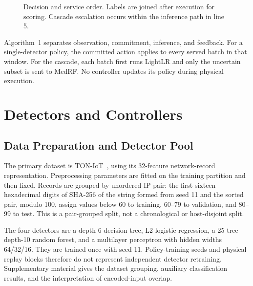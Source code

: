 \documentclass[journal]{IEEEtran}
\begin{document}
\begin{figure}[t]
\centering{}
\caption{Decision and service order. Labels are joined after execution for scoring. Cascade escalation occurs within the inference path in line 5.}
\label{fig:algorithm}
\end{figure}

Algorithm~1 separates observation, commitment, inference, and feedback. For a single-detector policy, the committed action applies to every served batch in that window. For the cascade, each batch first runs LightLR and only the uncertain subset is sent to MedRF. No controller updates its policy during physical execution.

\section{Detectors and Controllers}\label{sec:methods}
\subsection{Data Preparation and Detector Pool}
The primary dataset is TON-IoT~\cite{TONSource}, using its 32-feature network-record representation. Preprocessing parameters are fitted on the training partition and then fixed. Records are grouped by unordered IP pair: the first sixteen hexadecimal digits of SHA-256 of the string formed from seed 11 and the sorted pair, modulo 100, assign values below 60 to training, 60--79 to validation, and 80--99 to test. This is a pair-grouped split, not a chronological or host-disjoint split.

The four detectors are a depth-6 decision tree, L2 logistic regression, a 25-tree depth-10 random forest, and a multilayer perceptron with hidden widths 64/32/16. They are trained once with seed 11. Policy-training seeds and physical replay blocks therefore do not represent independent detector retraining. Supplementary material gives the dataset grouping, auxiliary classification results, and the interpretation of encoded-input overlap.
\end{document}
